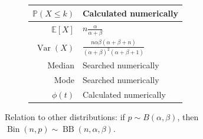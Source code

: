 \documentclass[a4paper,11pt]{article}
\theoremstyle{plain}
\theoremstyle{definition}
\newcommand{\ME}{\mathbb{E}}
\newcommand{\MP}{\mathbb{P}}
\newcommand{\Var}{\operatorname{Var}}
\begin{document}
\begin{figure}[!htb]
\begin{minipage}{0.4\textwidth}
\begin{tabular}{| r | l |}
				\hline
				$\MP(X \leq k)$ & Calculated numerically \\
				\hline
				$\ME[X]$ & $ n \frac{\alpha}{\alpha + \beta}$ \\
				\hline
				$\Var(X)$ & $\frac{n\alpha \beta (\alpha + \beta + n) }{(\alpha+\beta)^2(\alpha+\beta + 1)} $ \\
				\hline
				Median & Searched numerically \\
				\hline
				Mode & Searched numerically \\
				\hline
				$\phi(t)$ & Calculated numerically \\
				\hline
			\end{tabular}
		\end{minipage}
	\end{figure}

    Relation to other distributions: if $ p \sim B(\alpha, \beta)$, then $\operatorname{Bin}(n, p) \sim \operatorname{BB}(n, \alpha, \beta)$.

	\pagebreak
\end{document}
